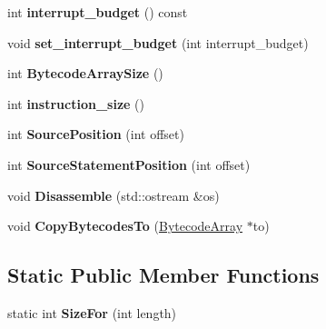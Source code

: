 \begin{DoxyCompactItemize}
\item 
int {\bfseries interrupt\+\_\+budget} () const \hypertarget{classv8_1_1internal_1_1_bytecode_array_af3a6cc5cdac6f963500caa21e76c94db}{}\label{classv8_1_1internal_1_1_bytecode_array_af3a6cc5cdac6f963500caa21e76c94db}

\item 
void {\bfseries set\+\_\+interrupt\+\_\+budget} (int interrupt\+\_\+budget)\hypertarget{classv8_1_1internal_1_1_bytecode_array_a72a167803c49b95918248f228c95c56a}{}\label{classv8_1_1internal_1_1_bytecode_array_a72a167803c49b95918248f228c95c56a}

\item 
int {\bfseries Bytecode\+Array\+Size} ()\hypertarget{classv8_1_1internal_1_1_bytecode_array_a7cf600be981c1a210f7cf1985fb0d157}{}\label{classv8_1_1internal_1_1_bytecode_array_a7cf600be981c1a210f7cf1985fb0d157}

\item 
int {\bfseries instruction\+\_\+size} ()\hypertarget{classv8_1_1internal_1_1_bytecode_array_aaf32c9bd6613e7404c4175281805265c}{}\label{classv8_1_1internal_1_1_bytecode_array_aaf32c9bd6613e7404c4175281805265c}

\item 
int {\bfseries Source\+Position} (int offset)\hypertarget{classv8_1_1internal_1_1_bytecode_array_a895c353eea90d34b339599271f7f58dc}{}\label{classv8_1_1internal_1_1_bytecode_array_a895c353eea90d34b339599271f7f58dc}

\item 
int {\bfseries Source\+Statement\+Position} (int offset)\hypertarget{classv8_1_1internal_1_1_bytecode_array_aa23e01cf402a27f6c64175e5e67ea6e7}{}\label{classv8_1_1internal_1_1_bytecode_array_aa23e01cf402a27f6c64175e5e67ea6e7}

\item 
void {\bfseries Disassemble} (std\+::ostream \&os)\hypertarget{classv8_1_1internal_1_1_bytecode_array_aa697b1df23298f823e8d7665d6e059ec}{}\label{classv8_1_1internal_1_1_bytecode_array_aa697b1df23298f823e8d7665d6e059ec}

\item 
void {\bfseries Copy\+Bytecodes\+To} (\hyperlink{classv8_1_1internal_1_1_bytecode_array}{Bytecode\+Array} $\ast$to)\hypertarget{classv8_1_1internal_1_1_bytecode_array_a299bb567020f5e2a9bf00f3ac3612aa0}{}\label{classv8_1_1internal_1_1_bytecode_array_a299bb567020f5e2a9bf00f3ac3612aa0}

\end{DoxyCompactItemize}
\subsection*{Static Public Member Functions}
\begin{DoxyCompactItemize}
\item 
static int {\bfseries Size\+For} (int length)\hypertarget{classv8_1_1internal_1_1_bytecode_array_ac3a55b15152573add7b487ea3839b277}{}\label{classv8_1_1internal_1_1_bytecode_array_ac3a55b15152573add7b487ea3839b277}

\end{DoxyCompactItemize}
